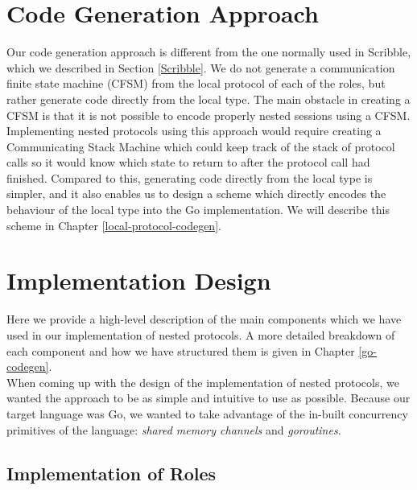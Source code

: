 \documentclass[12pt,twoside]{report}
\begin{document}


\section{Code Generation Approach}\label{codegen-approach}
Our code generation approach is different from the one normally used in Scribble, which we described in Section \ref{Scribble}. We do not generate a communication finite state machine (CFSM) from the local protocol of each of the roles, but rather generate code directly from the local type. The main obstacle in creating a CFSM is that it is not possible to encode properly nested sessions using a CFSM. Implementing nested protocols using this approach would require creating a Communicating Stack Machine which could keep track of the stack of protocol calls so it would know which state to return to after the protocol call had finished. Compared to this, generating code directly from the local type is simpler, and it also enables us to design a scheme which directly encodes the behaviour of the local type into the Go implementation. We will describe this scheme in Chapter \ref{local-protocol-codegen}.

\section{Implementation Design}\label{design-overview}
Here we provide a high-level description of the main components which we have used in our implementation of nested protocols. A more detailed breakdown of each component and how we have structured them is given in Chapter \ref{go-codegen}. \\

When coming up with the design of the implementation of nested protocols, we wanted the approach to be as simple and intuitive to use as possible. Because our target language was Go, we wanted to take advantage of the in-built concurrency primitives of the language: \textit{shared memory channels} and \textit{goroutines}.

\subsection{Implementation of Roles}
\end{document}
